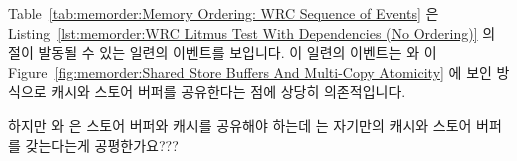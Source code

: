 Table~\ref{tab:memorder:Memory Ordering: WRC Sequence of Events}
은
Listing~\ref{lst:memorder:WRC Litmus Test With Dependencies (No Ordering)}
의  절이 발동될 수 있는 일련의 이벤트를 보입니다.
이 일련의 이벤트는  와  이
Figure~\ref{fig:memorder:Shared Store Buffers And Multi-Copy Atomicity} 에 보인
방식으로 캐시와 스토어 버퍼를 공유한다는 점에 상당히 의존적입니다.

\QuickQuiz{}
	하지만  와  은 스토어 버퍼와 캐시를 공유해야 하는데
	 는 자기만의 캐시와 스토어 버퍼를 갖는다는게 공평한가요???
	\iffalse

